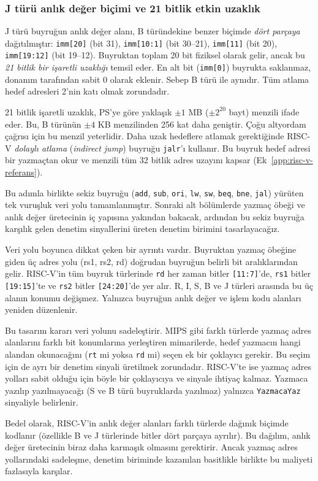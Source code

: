 \subsubsection*{J türü anlık değer biçimi ve 21 bitlik etkin uzaklık}

J türü buyruğun anlık değer alanı, B türündekine benzer biçimde \emph{dört parçaya} dağıtılmıştır: \texttt{imm[20]} (bit 31), \texttt{imm[10:1]} (bit 30--21), \texttt{imm[11]} (bit 20), \texttt{imm[19:12]} (bit 19--12). Buyruktan toplam 20 bit fiziksel olarak gelir, ancak bu \emph{21 bitlik bir işaretli uzaklığı} temsil eder. En alt bit (\texttt{imm[0]}) buyrukta saklanmaz, donanım tarafından sabit 0 olarak eklenir. Sebep B türü ile aynıdır. Tüm atlama hedef adresleri 2'nin katı olmak zorundadır.

21 bitlik işaretli uzaklık, PS'ye göre yaklaşık $\pm 1$ MB ($\pm 2^{20}$ bayt) menzili ifade eder. Bu, B türünün $\pm 4$ KB menzilinden 256 kat daha geniştir. Çoğu altyordam çağrısı için bu menzil yeterlidir. Daha uzak hedeflere atlamak gerektiğinde RISC-V \emph{dolaylı atlama} (\emph{indirect jump}) buyruğu \texttt{jalr}'ı kullanır. Bu buyruk hedef adresi bir yazmaçtan okur ve menzili tüm 32 bitlik adres uzayını kapsar (Ek~\ref{app:risc-v-referans}).

\medskip
Bu adımla birlikte sekiz buyruğu (\texttt{add}, \texttt{sub}, \texttt{ori}, \texttt{lw}, \texttt{sw}, \texttt{beq}, \texttt{bne}, \texttt{jal}) yürüten tek vuruşluk veri yolu tamamlanmıştır. Sonraki alt bölümlerde yazmaç öbeği ve anlık değer üretecinin iç yapısına yakından bakacak, ardından bu sekiz buyruğa karşılık gelen denetim sinyallerini üreten denetim birimini tasarlayacağız.

\begin{karsilastirma}
Veri yolu boyunca dikkat çeken bir ayrıntı vardır. Buyruktan yazmaç öbeğine giden üç adres yolu (rs1, rs2, rd) doğrudan buyruğun belirli bit aralıklarından gelir. RISC-V'in tüm buyruk türlerinde \texttt{rd} her zaman bitler \texttt{[11:7]}'de, \texttt{rs1} bitler \texttt{[19:15]}'te ve \texttt{rs2} bitler \texttt{[24:20]}'de yer alır. R, I, S, B ve J türleri arasında bu üç alanın konumu değişmez. Yalnızca buyruğun anlık değer ve işlem kodu alanları yeniden düzenlenir.

Bu tasarım kararı veri yolunu sadeleştirir. MIPS gibi farklı türlerde yazmaç adres alanlarını farklı bit konumlarına yerleştiren mimarilerde, hedef yazmacın hangi alandan okunacağını (\texttt{rt} mi yoksa \texttt{rd} mi) seçen ek bir çoklayıcı gerekir. Bu seçim için de ayrı bir denetim sinyali üretilmek zorundadır. RISC-V'te ise yazmaç adres yolları sabit olduğu için böyle bir çoklayıcıya ve sinyale ihtiyaç kalmaz. Yazmaca yazılıp yazılmayacağı (S ve B türü buyruklarda yazılmaz) yalnızca \texttt{YazmacaYaz} sinyaliyle belirlenir.

Bedel olarak, RISC-V'in anlık değer alanları farklı türlerde dağınık biçimde kodlanır (özellikle B ve J türlerinde bitler dört parçaya ayrılır). Bu dağılım, anlık değer üretecinin biraz daha karmaşık olmasını gerektirir. Ancak yazmaç adres yollarındaki sadeleşme, denetim biriminde kazanılan basitlikle birlikte bu maliyeti fazlasıyla karşılar.
\end{karsilastirma}

